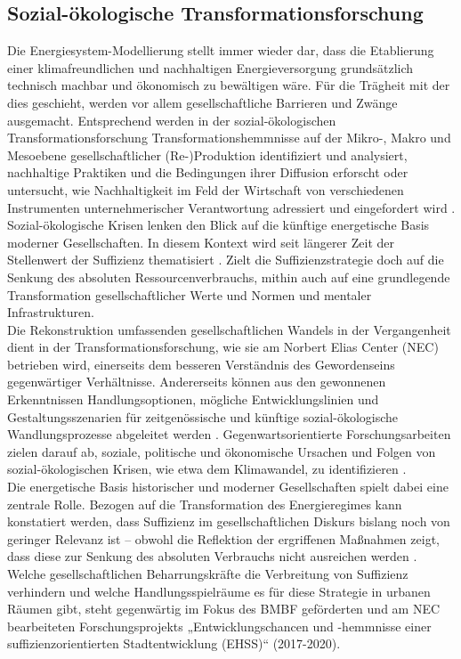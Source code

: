 \documentclass[a4paper,11pt,twoside]{scrartcl}
\begin{document}
\subsection*{Sozial-ökologische Transformationsforschung}
Die Energiesystem-Modellierung stellt immer wieder dar, dass die Etablierung einer klimafreundlichen und nachhaltigen Energieversorgung grundsätzlich technisch machbar und ökonomisch zu bewältigen wäre. Für die Trägheit mit der dies geschieht, werden vor allem gesellschaftliche Barrieren und Zwänge ausgemacht.
Entsprechend werden in der sozial-ökologischen Transformationsforschung Transformationshemmnisse auf der Mikro-, Makro und Mesoebene gesellschaftlicher (Re-)Produktion identifiziert und analysiert, nachhaltige Praktiken und die Bedingungen ihrer Diffusion erforscht \cite{Kny2015} oder untersucht, wie Nachhaltigkeit im Feld der Wirtschaft von verschiedenen Instrumenten unternehmerischer Verantwortung adressiert und eingefordert wird \cite{Sommer2016b}. 
Sozial-ökologische Krisen lenken den Blick auf die künftige energetische Basis moderner Gesellschaften. In diesem Kontext wird seit längerer Zeit der Stellenwert der Suffizienz thematisiert \cite{Huber1995,Fischer2013,Schneidewind2013}. Zielt die Suffizienzstrategie doch auf die Senkung des absoluten Ressourcenverbrauchs, mithin auch auf eine grundlegende Transformation gesellschaftlicher Werte und Normen und mentaler Infrastrukturen.\\
Die Rekonstruktion umfassenden gesellschaftlichen Wandels in der Vergangenheit dient in der Transformationsforschung, wie sie am Norbert Elias Center (NEC) betrieben wird, einerseits dem besseren Verständnis des Gewordenseins gegenwärtiger Verhältnisse. Andererseits können aus den gewonnenen Erkenntnissen Handlungsoptionen, mögliche Entwicklungslinien und Gestaltungsszenarien für zeitgenössische und künftige sozial-ökologische Wandlungsprozesse abgeleitet werden \cite{Christ2015,Christ2016}. Gegenwartsorientierte Forschungsarbeiten zielen darauf ab, soziale, politische und ökonomische Ursachen und Folgen von sozial-ökologischen Krisen, wie etwa dem Klimawandel, zu identifizieren \cite{Sommer2011,Sommer2015,Stumpf2015}.\\ 
Die energetische Basis historischer und moderner Gesellschaften spielt dabei eine zentrale Rolle. Bezogen auf die Transformation des Energieregimes kann konstatiert werden, dass Suffizienz im gesellschaftlichen Diskurs bislang noch von geringer Relevanz ist – obwohl die Reflektion der ergriffenen Maßnahmen zeigt, dass diese zur Senkung des absoluten Verbrauchs nicht ausreichen werden \cite{Brischke2016}. Welche gesellschaftlichen Beharrungskräfte die Verbreitung von Suffizienz verhindern und welche Handlungsspielräume es für diese Strategie in urbanen Räumen gibt, steht gegenwärtig im Fokus des BMBF geförderten und am NEC bearbeiteten Forschungsprojekts „Entwicklungschancen und -hemmnisse einer suffizienzorientierten Stadtentwicklung (EHSS)“ (2017-2020). 
\end{document}
